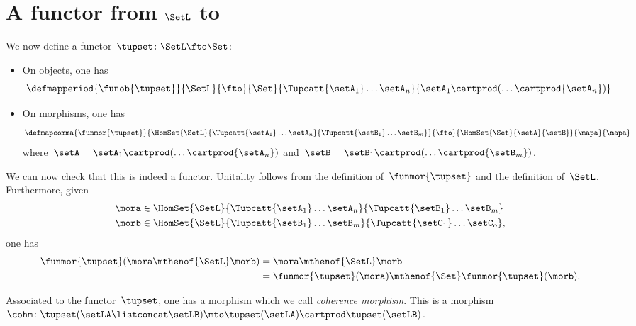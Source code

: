 \section{A functor from $\SetL$ to \Set}
\label{sec:funsetstarset}
We now define a functor~$\tupset\colon \SetL \fto \Set$:
\begin{itemize}
    \item On objects, one has
          \begin{equation*}
              \defmapperiod{\funob{\tupset}}{\SetL}{\fto}{\Set}{\Tupcatt {\setA_1}  \dots {\setA_n}}{{\setA_1}\cartprod (\ldots \cartprod {\setA_n})}
          \end{equation*}
    \item On morphisms, one has
          \begin{equation*}
              \defmapcomma{\funmor{\tupset}}{\HomSet{\SetL}{\Tupcatt{\setA_1}\dots{\setA_n}}{\Tupcatt{\setB_1} \dots {\setB_m}}}
              {\fto}{\HomSet{\Set}{\setA}{\setB}}{\mapa}{\mapa}
          \end{equation*}
          where~$\setA={\setA_1} \cartprod (\ldots \cartprod {\setA_n})$ and~$\setB={\setB_1} \cartprod (\ldots \cartprod {\setB_m})$.
\end{itemize}
We can now check that this is indeed a functor.
Unitality follows from the definition of~$\funmor{\tupset}$ and the definition of~$\SetL$.
Furthermore, given
\begin{equation*}
    \begin{aligned}
         & \mora \in \HomSet{\SetL}{\Tupcatt{\setA_1}\dots{\setA_n}}{\Tupcatt{\setB_1} \dots {\setB_m}} \\
         & \morb \in \HomSet{\SetL}{\Tupcatt{\setB_1}\dots{\setB_m}}{\Tupcatt{\setC_1}\dots {\setC_o}},
    \end{aligned}
\end{equation*}
one has
\begin{equation*}
    \begin{aligned}
        \funmor{\tupset}(\mora \mthenof{\SetL} \morb) & =\mora\mthenof{\SetL} \morb \\
                                                      & =\funmor{\tupset}(\mora)\mthenof{\Set} \funmor{\tupset}(\morb).
    \end{aligned}
\end{equation*}

\showslides{
    \begin{forslides}

        \begin{equation}
            \tupca \ela   = \ela
        \end{equation}
        ~
        \begin{equation}
            \label{eq:sets-monoid-el-cat}
            \tupcat \ela \elb \elconcat \elc = \tupcatt \ela \elb \elc
        \end{equation}
    \end{forslides}
}

Associated to the functor~$\tupset$, one has a morphism which we call \emph{coherence morphism}.
This is a morphism~$\cohm\colon \tupset(\setLA\listconcat \setLB)\mto \tupset(\setLA)\cartprod \tupset(\setLB)$.

